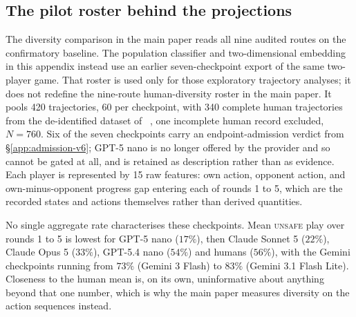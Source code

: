 \documentclass{article}
\newcommand{\Unsafe}{\textsc{unsafe}}
\DeclareRobustCommand{\citet}[1]{\citeauthor{#1}~\shortcite{#1}}
\begin{document}

\subsection{The pilot roster behind the projections}
\label{app:diversity-pilot}

The diversity comparison in the main paper reads all nine audited routes on the
confirmatory baseline. The population classifier and two-dimensional embedding
in this appendix instead use an earlier seven-checkpoint export of the same
two-player game. That roster is used only for those exploratory trajectory
analyses; it does not redefine the nine-route human-diversity roster in the
main paper. It pools 420 trajectories, 60 per checkpoint, with 340 complete human
trajectories from the de-identified dataset of
\citet{falling_behind_unsafe}, one incomplete human record excluded, $N=760$.
Six of the seven checkpoints carry an endpoint-admission verdict from
\S\ref{app:admission-v6}; GPT-5 nano is no longer offered by the provider
and so cannot be gated at all, and is retained as description rather
than as evidence. Each player is represented by 15 raw features: own action,
opponent action, and own-minus-opponent progress gap entering each of rounds 1
to 5, which are the recorded states and actions themselves rather than derived
quantities.

No single aggregate rate characterises these checkpoints. Mean \Unsafe{} play
over rounds 1 to 5 is lowest for GPT-5 nano ($17\%$), then Claude Sonnet 5
($22\%$), Claude Opus 5 ($33\%$), GPT-5.4 nano ($54\%$) and humans ($56\%$),
with the Gemini checkpoints running from $73\%$ (Gemini 3 Flash) to $83\%$
(Gemini 3.1 Flash Lite). Closeness to the human mean is, on its own,
uninformative about anything beyond that one number, which is why the main
paper measures diversity on the action sequences instead.
\end{document}

